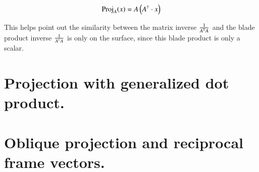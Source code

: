 \documentclass{article}      %
\newcommand{\T}[0]{\text{T}}
\begin{document}
\[
\operatorname{Proj}_A(x) = A \left(A^\dagger \cdot x\right)
\]

This helps point out the similarity between the matrix inverse $\inv{A^\T A}$ and the blade product inverse $\frac{1}{{A^\dagger}A}$ is only on the surface,
since this blade product is only a scalar.






\section{ Projection with generalized dot product. }

\section{ Oblique projection and reciprocal frame vectors. }




















%
%
%




%
\end{document}
